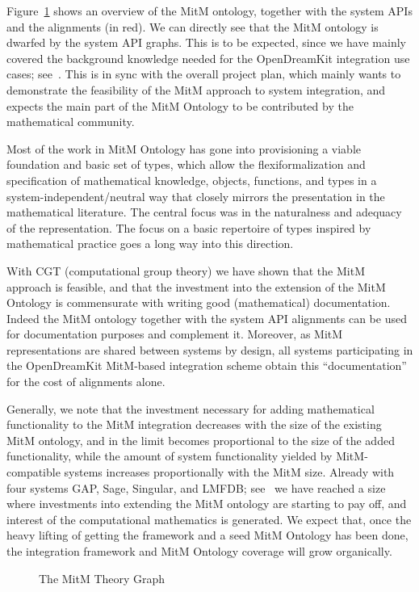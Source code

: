 Figure~\ref{fig:MitM-graph} shows an overview of the MitM ontology, together with the
system APIs and the alignments (in red). We can directly see that the MitM ontology is
dwarfed by the system API graphs. This is to be expected, since we have mainly covered the
background knowledge needed for the OpenDreamKit integration use cases;
see~\cite{ODK-D6.5}. This is in sync with the overall project plan, which mainly wants to
demonstrate the feasibility of the MitM approach to system integration, and expects the
main part of the MitM Ontology to be contributed by the mathematical community.

Most of the work in MitM Ontology has gone into provisioning a viable foundation
and basic set of types, which allow the flexiformalization and specification of
mathematical knowledge, objects, functions, and types in a system-independent/neutral way
that closely mirrors the presentation in the mathematical literature. The central focus
was in the naturalness and adequacy of the representation. The focus on a basic repertoire
of types inspired by mathematical practice goes a long way into this direction.

With CGT (computational group theory) we have shown that the MitM approach is feasible,
and that the investment into the extension of the MitM Ontology is commensurate with
writing good (mathematical) documentation. Indeed the MitM ontology together with the
system API alignments can be used for documentation purposes and complement it. Moreover, as
MitM representations are shared between systems by design, all systems participating in
the OpenDreamKit MitM-based integration scheme obtain this ``documentation'' for the cost
of alignments alone. 

Generally, we note that the investment necessary for adding mathematical functionality to
the MitM integration decreases with the size of the existing MitM ontology, and in the
limit becomes proportional to the size of the added functionality, while the amount of
system functionality yielded by MitM-compatible systems increases proportionally with the
MitM size. Already with four systems GAP, Sage, Singular, and LMFDB; see~\cite{ODK-D6.5}
we have reached a size where investments into extending the MitM ontology are starting to
pay off, and interest of the computational mathematics is generated. We expect that, once
the heavy lifting of getting the framework and a seed MitM Ontology has been done,
the integration framework and MitM Ontology coverage will grow organically.

\begin{figure}\centering
  \caption{The MitM Theory Graph}\label{fig:MitM-graph}
\end{figure}

